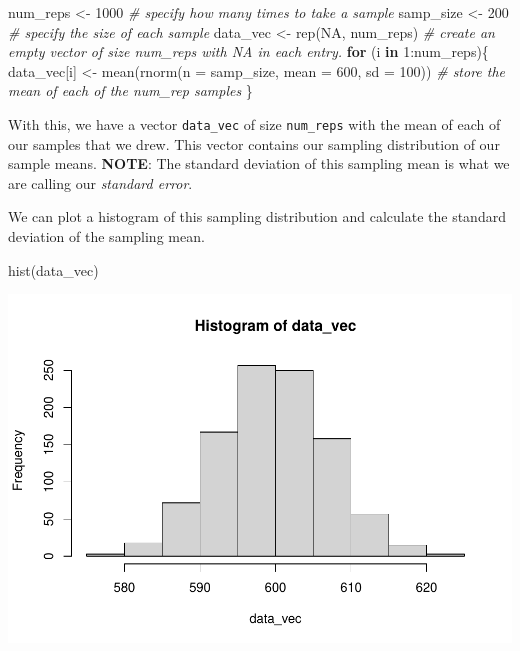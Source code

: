 \documentclass[
]{book}
\newenvironment{Shaded}{\begin{snugshade}}{\end{snugshade}}
\newcommand{\AttributeTok}[1]{\textcolor[rgb]{0.77,0.63,0.00}{#1}}
\newcommand{\CommentTok}[1]{\textcolor[rgb]{0.56,0.35,0.01}{\textit{#1}}}
\newcommand{\ConstantTok}[1]{\textcolor[rgb]{0.00,0.00,0.00}{#1}}
\newcommand{\ControlFlowTok}[1]{\textcolor[rgb]{0.13,0.29,0.53}{\textbf{#1}}}
\newcommand{\DecValTok}[1]{\textcolor[rgb]{0.00,0.00,0.81}{#1}}
\newcommand{\FunctionTok}[1]{\textcolor[rgb]{0.00,0.00,0.00}{#1}}
\newcommand{\NormalTok}[1]{#1}
\newcommand{\OtherTok}[1]{\textcolor[rgb]{0.56,0.35,0.01}{#1}}
\newcommand{\SpecialCharTok}[1]{\textcolor[rgb]{0.00,0.00,0.00}{#1}}
\begin{document}
\begin{Shaded}
\begin{Highlighting}[]
\NormalTok{num\_reps }\OtherTok{\textless{}{-}} \DecValTok{1000} \CommentTok{\# specify how many times to take a sample}
\NormalTok{samp\_size }\OtherTok{\textless{}{-}} \DecValTok{200} \CommentTok{\# specify the size of each sample}
\NormalTok{data\_vec }\OtherTok{\textless{}{-}} \FunctionTok{rep}\NormalTok{(}\ConstantTok{NA}\NormalTok{, num\_reps) }\CommentTok{\# create an empty vector of size num\_reps with NA in each entry.}
\ControlFlowTok{for}\NormalTok{ (i }\ControlFlowTok{in} \DecValTok{1}\SpecialCharTok{:}\NormalTok{num\_reps)\{}
\NormalTok{  data\_vec[i] }\OtherTok{\textless{}{-}} \FunctionTok{mean}\NormalTok{(}\FunctionTok{rnorm}\NormalTok{(}\AttributeTok{n =}\NormalTok{ samp\_size, }\AttributeTok{mean =} \DecValTok{600}\NormalTok{, }\AttributeTok{sd =} \DecValTok{100}\NormalTok{)) }\CommentTok{\# store the mean of each of the num\_rep samples}
\NormalTok{\}}
\end{Highlighting}
\end{Shaded}

With this, we have a vector \texttt{data\_vec} of size \texttt{num\_reps} with the mean of each of our samples that we drew. This vector contains our sampling distribution of our sample means. \textbf{NOTE}: The standard deviation of this sampling mean is what we are calling our \emph{standard error}.

We can plot a histogram of this sampling distribution and calculate the standard deviation of the sampling mean.

\begin{Shaded}
\begin{Highlighting}[]
\FunctionTok{hist}\NormalTok{(data\_vec)}
\end{Highlighting}
\end{Shaded}

\includegraphics{test_course_notes_files/figure-latex/unnamed-chunk-23-1.pdf}
\end{document}
